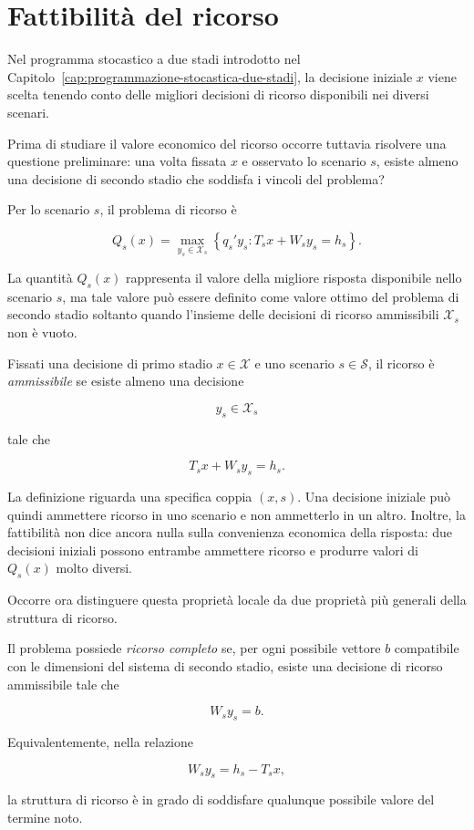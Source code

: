 \section{Fattibilit\`a del ricorso}

\label{sec:cap15-fattibilita-ricorso-v2}

Nel programma stocastico a due stadi introdotto nel
Capitolo~\ref{cap:programmazione-stocastica-due-stadi}, la decisione iniziale
$x$ viene scelta tenendo conto delle migliori decisioni di ricorso disponibili
nei diversi scenari.

Prima di studiare il valore economico del ricorso occorre tuttavia risolvere
una questione preliminare: una volta fissata $x$ e osservato lo scenario $s$,
esiste almeno una decisione di secondo stadio che soddisfa i vincoli del
problema?

Per lo scenario $s$, il problema di ricorso \`e

\[
Q_s(x)
=
\max_{y_s\in\mathcal X_s}
\left\{
q_s'y_s:
T_sx+W_sy_s=h_s
\right\}.
\]

La quantit\`a $Q_s(x)$ rappresenta il valore della migliore risposta
disponibile nello scenario $s$, ma tale valore pu\`o essere definito come
valore ottimo del problema di secondo stadio soltanto quando l'insieme delle
decisioni di ricorso ammissibili $\mathcal X_s$ non \`e vuoto.

\begin{definition}

Fissati una decisione di primo stadio $x\in\mathcal X$ e uno scenario
$s\in\mathcal S$, il ricorso \`e \emph{ammissibile} se esiste almeno una
decisione

\[
y_s\in\mathcal X_s
\]

tale che

\[
T_sx+W_sy_s=h_s.
\]

\end{definition}

La definizione riguarda una specifica coppia $(x,s)$. Una decisione iniziale
pu\`o quindi ammettere ricorso in uno scenario e non ammetterlo in un altro.
Inoltre, la fattibilit\`a non dice ancora nulla sulla convenienza economica
della risposta: due decisioni iniziali possono entrambe ammettere ricorso e
produrre valori di $Q_s(x)$ molto diversi.

Occorre ora distinguere questa propriet\`a locale da due propriet\`a pi\`u
generali della struttura di ricorso.

\begin{definition}

Il problema possiede \emph{ricorso completo} se, per ogni possibile vettore
$b$ compatibile con le dimensioni del sistema di secondo stadio, esiste una
decisione di ricorso ammissibile tale che

\[
W_sy_s=b.
\]

Equivalentemente, nella relazione

\[
W_sy_s=h_s-T_sx,
\]

la struttura di ricorso \`e in grado di soddisfare qualunque possibile valore
del termine noto.

\end{definition}

